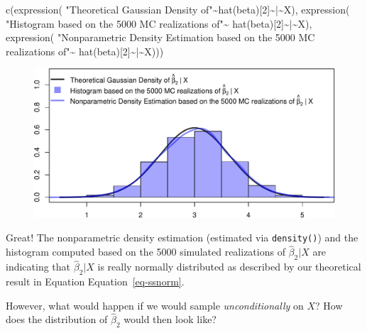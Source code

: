 \documentclass[
  letterpaper,
  DIV=11,
  numbers=noendperiod]{scrreprt}
\newenvironment{Shaded}{\begin{snugshade}}{\end{snugshade}}
\newcommand{\DecValTok}[1]{\textcolor[rgb]{0.68,0.00,0.00}{#1}}
\newcommand{\FunctionTok}[1]{\textcolor[rgb]{0.28,0.35,0.67}{#1}}
\newcommand{\NormalTok}[1]{\textcolor[rgb]{0.00,0.23,0.31}{#1}}
\newcommand{\SpecialCharTok}[1]{\textcolor[rgb]{0.37,0.37,0.37}{#1}}
\newcommand{\StringTok}[1]{\textcolor[rgb]{0.13,0.47,0.30}{#1}}
\theoremstyle{definition}
\theoremstyle{plain}
\theoremstyle{plain}
\theoremstyle{remark}
\begin{document}
\begin{Shaded}
\begin{Highlighting}[]
\FunctionTok{c}\NormalTok{(}\FunctionTok{expression}\NormalTok{(}
  \StringTok{"Theoretical Gaussian Density of"}\SpecialCharTok{\textasciitilde{}}\FunctionTok{hat}\NormalTok{(beta)[}\DecValTok{2}\NormalTok{]}\SpecialCharTok{\textasciitilde{}}\StringTok{\textquotesingle{}|\textquotesingle{}}\SpecialCharTok{\textasciitilde{}}\NormalTok{X), }
  \FunctionTok{expression}\NormalTok{(}
  \StringTok{"Histogram based on the 5000 MC realizations of"}\SpecialCharTok{\textasciitilde{}}
  \FunctionTok{hat}\NormalTok{(beta)[}\DecValTok{2}\NormalTok{]}\SpecialCharTok{\textasciitilde{}}\StringTok{\textquotesingle{}|\textquotesingle{}}\SpecialCharTok{\textasciitilde{}}\NormalTok{X), }
  \FunctionTok{expression}\NormalTok{(}
  \StringTok{"Nonparametric Density Estimation based on the 5000 MC realizations of"}\SpecialCharTok{\textasciitilde{}}
  \FunctionTok{hat}\NormalTok{(beta)[}\DecValTok{2}\NormalTok{]}\SpecialCharTok{\textasciitilde{}}\StringTok{\textquotesingle{}|\textquotesingle{}}\SpecialCharTok{\textasciitilde{}}\NormalTok{X)))}
\end{Highlighting}
\end{Shaded}

\begin{figure}[H]

{\centering \includegraphics{./05-Small-Sample-Inference_files/figure-pdf/unnamed-chunk-13-1.pdf}

}

\end{figure}

Great! The nonparametric density estimation (estimated via
\texttt{density()}) and the histogram computed based on the 5000
simulated realizations of \(\hat\beta_2|X\) are indicating that
\(\hat\beta_2|X\) is really normally distributed as described by our
theoretical result in Equation Equation~\ref{eq-ssnorm}.

However, what would happen if we would sample \emph{unconditionally} on
\(X\)? How does the distribution of \(\hat\beta_2\) would then look
like?
\end{document}
